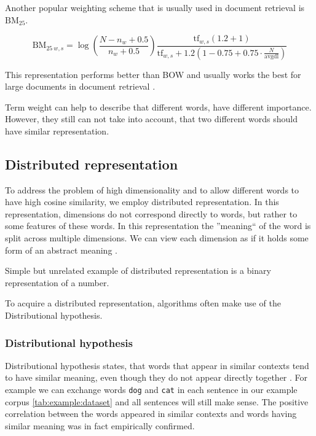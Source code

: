         Another popular weighting scheme that is usually used in document retrieval is $\mathrm{BM_{25}}$. 
        
        $$\mathrm{BM}_{25~w,s} = \log \left(\frac{N-n_w+0.5}{n_w + 0.5}\right)    \frac{\mathrm{tf}_{w,s} (1.2 + 1)}{\mathrm{tf}_{w,s} + 1.2  \left(1 - 0.75 + 0.75 \cdot \frac{N}{\text{avgdl}}\right)}$$
        
        This representation performs better than BOW and usually works the best for large documents in document retrieval \cite{li2014semantic}.
        
        Term weight can help to describe that different words, have different importance.
        However, they still can not take into account, that two different words should have similar representation.
        
        \subsection{Distributed representation}
        To address the problem of high dimensionality and to allow different words to have high cosine similarity, we employ distributed representation.
        In this representation, dimensions do not correspond directly to words, but rather to some features of these words.
        In this representation the ''meaning`` of the word is split across multiple dimensions.
        We can view each dimension as if it holds some form of an abstract meaning \cite{le2014distributed}. 
        
        Simple but unrelated example of distributed representation is a binary representation of a number.
        
        To acquire a distributed representation, algorithms often make use of the Distributional hypothesis.
        \* %

        \subsubsection{Distributional hypothesis}
        Distributional hypothesis states, that words that appear in similar contexts tend to have similar meaning,
        even though they do not appear directly together \cite{harris1954distributional} \cite{Rubenstein:1965:CCS:365628.365657}. %
        For example we can exchange words \texttt{dog} and \texttt{cat} in each sentence in our example corpus \ref{tab:example:dataset}
        and all sentences will still make sense. 
        The positive correlation between the words appeared in similar contexts and words having similar meaning was in fact empirically confirmed.
        
